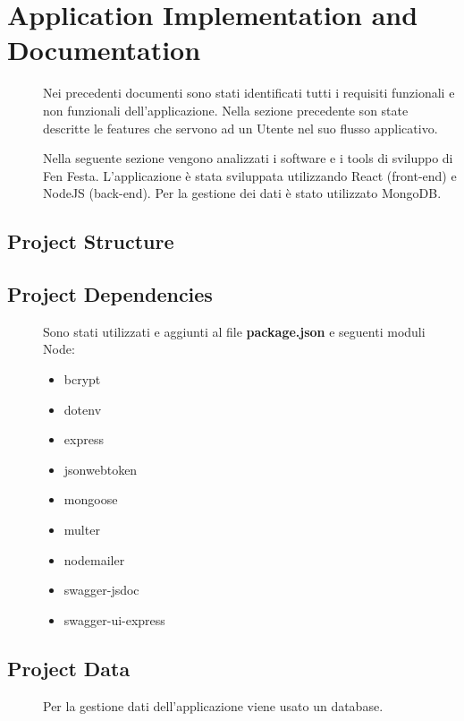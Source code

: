 \documentclass{article}
\begin{document}
\section{Application Implementation and Documentation}
\begin{description}
    \item[] Nei precedenti documenti sono stati identificati tutti i requisiti funzionali e non funzionali
        dell'applicazione. Nella sezione precedente son state descritte le features che servono ad un Utente nel
        suo flusso applicativo.
    \item[] Nella seguente sezione vengono analizzati i software e i tools di sviluppo di Fen Festa. L'applicazione è
        stata sviluppata utilizzando React (front-end) e NodeJS (back-end). Per la gestione dei dati è stato
        utilizzato MongoDB.
\end{description}
\subsection{Project Structure}
\begin{description}
    \item[]
\end{description}
\clearpage
\subsection{Project Dependencies}
\begin{description}
    \item[] Sono stati utilizzati e aggiunti al file \textbf{package.json} e seguenti moduli Node:
        \begin{itemize}
            \item bcrypt
            \item dotenv
            \item express
            \item jsonwebtoken
            \item mongoose
            \item multer
            \item nodemailer
            \item swagger-jsdoc
            \item swagger-ui-express
        \end{itemize}
\end{description}
\clearpage
\subsection{Project Data}
\begin{description}
    \item[] Per la gestione dati dell'applicazione viene usato un database.
\end{description}
\clearpage
\end{document}
